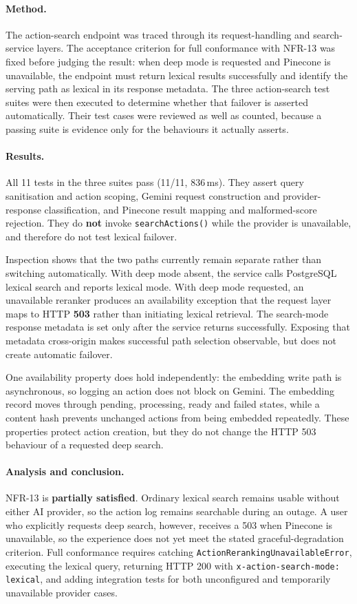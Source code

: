 \paragraph{Method.} The action-search endpoint was traced through its
request-handling and search-service layers. The acceptance criterion for full
conformance with NFR-13 was fixed before judging the result: when deep mode is
requested and Pinecone is unavailable, the endpoint must return lexical results
successfully and identify the serving path as lexical in its response metadata.
The three action-search test suites were then executed to determine whether that
failover is asserted automatically. Their test cases were reviewed as well as
counted, because a passing suite is evidence only for the behaviours it actually
asserts.

\paragraph{Results.} All 11 tests in the three suites pass (11/11, 836\,ms).
They assert query sanitisation and action scoping, Gemini request construction
and provider-response classification, and Pinecone result mapping and
malformed-score rejection. They do \textbf{not} invoke \texttt{searchActions()}
while the provider is unavailable, and therefore do not test lexical failover.

Inspection shows that the two paths currently remain separate rather than
switching automatically. With deep mode absent, the service calls PostgreSQL
lexical search and reports lexical mode. With deep mode requested, an
unavailable reranker produces an availability exception that the request layer
maps to HTTP \textbf{503} rather than initiating lexical retrieval. The
search-mode response metadata is set only after the service returns
successfully. Exposing that metadata cross-origin makes successful path
selection observable, but does not create automatic failover.

One availability property does hold independently: the embedding write path is
asynchronous, so logging an action does not block on Gemini. The embedding
record moves through pending, processing, ready and failed states, while a
content hash prevents unchanged actions from being embedded repeatedly. These
properties protect action creation, but they do not change the HTTP 503
behaviour of a requested deep search.

\paragraph{Analysis and conclusion.} NFR-13 is \textbf{partially satisfied}.
Ordinary lexical search remains usable without either AI provider, so the action
log remains searchable during an outage. A user who explicitly requests deep
search, however, receives a 503 when Pinecone is unavailable, so the experience
does not yet meet the stated graceful-degradation criterion. Full conformance
requires catching \texttt{ActionRerankingUnavailableError}, executing the
lexical query, returning HTTP 200 with \texttt{x-action-search-mode: lexical},
and adding integration tests for both unconfigured and temporarily unavailable
provider cases.

